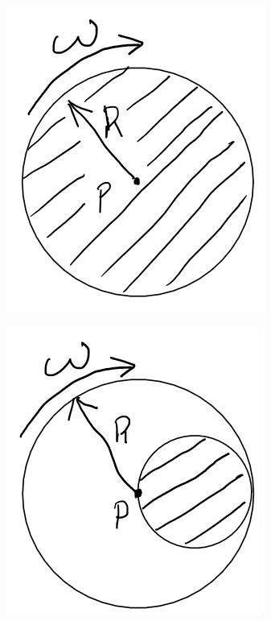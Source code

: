 \documentclass[a4paper,11pt]{article}
\begin{document}
\begin{figure}[H]
	\centering
	\begin{subfigure}[b]{0.25\textwidth}
		\centering
		\includegraphics[width=\textwidth]{Schijf1}
		\caption{}
		\label{fig:Schijf1}
	\end{subfigure}
	\hfill
	\begin{subfigure}[b]{0.25\textwidth}
		\centering
		\includegraphics[width=\textwidth]{Schijf2}

\end{subfigure}
\end{figure}
\end{document}
